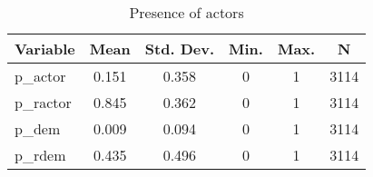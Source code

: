 
\begin{table}[htbp]\centering \caption{Presence of actors \label{sumstat}}
\begin{tabular}{l c c c c c}\hline\hline
\multicolumn{1}{c}{\textbf{Variable}} & \textbf{Mean}
 & \textbf{Std. Dev.}& \textbf{Min.} &  \textbf{Max.} & \textbf{N}\\ \hline
p\_actor & 0.151 & 0.358 & 0 & 1 & 3114\\
p\_ractor & 0.845 & 0.362 & 0 & 1 & 3114\\
p\_dem & 0.009 & 0.094 & 0 & 1 & 3114\\
p\_rdem & 0.435 & 0.496 & 0 & 1 & 3114\\
\hline\end{tabular}
\end{table}
